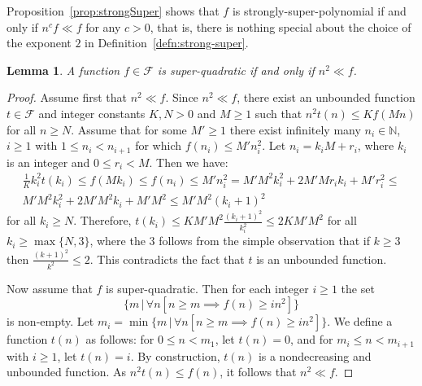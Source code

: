 \documentclass[11pt]{amsart}
\newtheorem{lemma}[theorem]{Lemma}
\theoremstyle{definition}
\newcommand\F{\mathcal F}
\renewcommand{\geq}{\geqslant} \renewcommand{\leq}{\leqslant} \renewcommand{\ge}{\geqslant} \renewcommand{\le}{\leqslant}
\begin{document}
Proposition~\ref{prop:strongSuper} shows that $f$ is strongly-super-polynomial if and only if $n^cf\ll f$ for any $c>0$, that is, there is nothing special about the choice of the exponent $2$ in Definition~\ref{defn:strong-super}.





\begin{lemma}\label{lem:equiv-super-quad}
	A function $f \in \F$
    is super-quadratic if
    and only if
    $n^2 \ll f$.
\end{lemma}
\begin{proof}
    Assume first that $n^2 \ll f$.
    Since $n^2 \ll f$, there exist an unbounded
    function $t \in \mathcal{F}$ and integer constants
    $K,N>0$ and $M \geqslant 1 $ such that
    $n^2 t(n) \leqslant  K f (M n)$ for all
    $n \geqslant N$.
    Assume that for some $M'\geqslant 1$ there exist
    infinitely many $n_i \in \mathbb{N}$, $i\geq 1$ with $1\leq n_i < n_{i+1}$ for which
    $f(n_i) \leqslant M' n_i^2$.
    Let $n_i = k_i M + r_i$, where $k_i$ is an integer
    and $0 \leqslant r_i < M$. Then we have:
    \begin{equation*}
    \begin{split}
       \frac1{K}  k_i ^2  t(k_i)\leqslant f (M k_i)
        \leqslant f (n_i)
        \leqslant M' n_i^2 = M' M^2 k_i^2 +
        2 M' M r_i k_i + M' r_i ^2 \leqslant \\
        M' M^2 k_i ^2 + 2 M' M^2 k_i + M' M^2
        \leqslant M' M^2 (k_i +1)^2
    \end{split}
    \end{equation*}
    for all $k_i \geqslant N$.
    Therefore, $t(k_i) \leqslant KM'M^2
    \frac{(k_i + 1)^2}{k_i^2} \leqslant 2 KM'M^2$ for all
    $k_i \geqslant \max\{N, 3\}$, where the $3$ follows from
    the simple observation that if
    $k \geqslant 3$ then $\frac{(k+1)^2}{k^2} \leqslant 2$.
    This contradicts the fact that $t$ is an unbounded function.

    Now assume that $f$ is super-quadratic. Then
    for each integer $i \geqslant 1$ the set
    \[ \{m \, |\,\forall n
    \left[n \geqslant m \implies f(n) \geqslant i n^2
    \right]\}\] is non-empty. Let $m_i=\min  \{m \, |\,\forall n
    \left[n \geqslant m \implies f(n) \geqslant i n^2
    \right]\}$.
    We define a function $t(n)$ as follows:
     for $0 \leqslant n < m_1$, let $t(n)=0$, and for
 $m_i \leq n < m_{i+1}$ with $i\geq 1$,  let $t(n) = i$.
    By construction, $t(n)$ is a nondecreasing and unbounded function.
    As $n^2 t(n) \leqslant f(n)$, it follows
    that $n^2 \ll f$.
 \end{proof}
\end{document}
